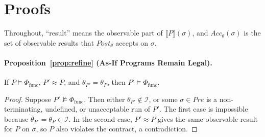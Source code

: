 \section{Proofs}
\label{app:proofs}

Throughout, ``result'' means the observable part of
\(\llbracket P \rrbracket(\sigma)\), and \(\mathit{Acc}_\theta(\sigma)\) is
the set of observable results that \(\mathit{Post}_\theta\) accepts on
\(\sigma\).

\paragraph{Proposition~\ref{prop:refine} (As-If Programs Remain Legal).}
If \(P \models \Phi_{\text{func}}\), \(P' \approx P\), and
\(\theta_{P'} = \theta_P\), then \(P' \models \Phi_{\text{func}}\).
\begin{proof}
Suppose \(P' \not\models \Phi_{\text{func}}\).
Then either \(\theta_{P'} \notin \mathcal{I}\), or some
\(\sigma \in \mathit{Pre}\) is a non-terminating, undefined, or unacceptable
run of \(P'\). The first case is impossible because
\(\theta_{P'} = \theta_P \in \mathcal{I}\). In the second case,
\(P' \approx P\) gives the same observable result for \(P\) on \(\sigma\),
so \(P\) also violates the contract, a contradiction.
\end{proof}

